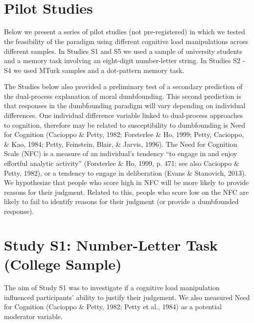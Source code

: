 \documentclass[
  american,
  man,floatsintext]{apa7}
\begin{document}
~

\newpage

~

\newpage

\hypertarget{pilot-studies}{%
\section{Pilot Studies}\label{pilot-studies}}

Below we present a series of pilot studies (not pre-registered) in which we tested the feasibility of the paradigm using different cognitive load manipulations across different samples. In Studies S1 and S5 we used a sample of university students and a memory task involving an eight-digit number-letter string. In Studies S2 - S4 we used MTurk samples and a dot-pattern memory task.

The Studies below also provided a preliminary test of a secondary prediction of the dual-process explanation of moral dumbfounding. This second prediction is that responses in the dumbfounding paradigm will vary depending on individual differences. One individual difference variable linked to dual-process approaches to cognition, therefore may be related to susceptibility to dumbfounding is Need for Cognition (Cacioppo \& Petty, 1982; Forsterlee \& Ho, 1999; Petty, Cacioppo, \& Kao, 1984; Petty, Feinstein, Blair, \& Jarvis, 1996). The Need for Cognition Scale (NFC) is a measure of an individual's tendency \enquote{to engage in and enjoy effortful analytic activity} (Forsterlee \& Ho, 1999, p. 471; see also Cacioppo \& Petty, 1982), or a tendency to engage in deliberation (Evans \& Stanovich, 2013). We hypothesize that people who score high in NFC will be more likely to provide reasons for their judgment. Related to this, people who score low on the NFC are likely to fail to identify reasons for their judgment (or provide a dumbfounded response).

\newpage

\hypertarget{study-s1-number-letter-task-college-sample}{%
\section{Study S1: Number-Letter Task (College Sample)}\label{study-s1-number-letter-task-college-sample}}

The aim of Study S1 was to investigate if a cognitive load manipulation influenced participants' ability to justify their judgement. We also measured Need for Cognition (Cacioppo \& Petty, 1982; Petty et al., 1984) as a potential moderator variable.
\end{document}
